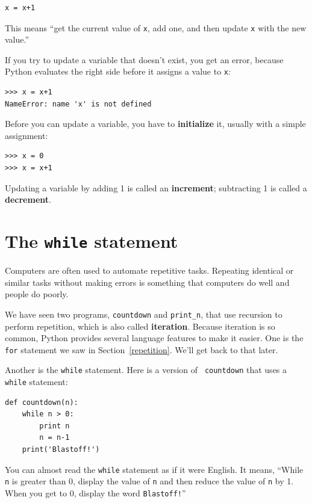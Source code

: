 \documentclass[10pt]{book}
\begin{document}
\beforeverb
\begin{verbatim}
x = x+1
\end{verbatim}
\afterverb
%
This means ``get the current value of {\tt x}, add one, and then
update {\tt x} with the new value.''

If you try to update a variable that doesn't exist, you get an
error, because Python evaluates the right side before it assigns
a value to {\tt x}:

\beforeverb
\begin{verbatim}
>>> x = x+1
NameError: name 'x' is not defined
\end{verbatim}
\afterverb
%
Before you can update a variable, you have to {\bf initialize}
it, usually with a simple assignment:


\beforeverb
\begin{verbatim}
>>> x = 0
>>> x = x+1
\end{verbatim}
\afterverb
%
Updating a variable by adding 1 is called an {\bf increment};
subtracting 1 is called a {\bf decrement}.





\section{The {\tt while} statement}


Computers are often used to automate repetitive tasks.  Repeating
identical or similar tasks without making errors is something that
computers do well and people do poorly.

We have seen two programs, {\tt countdown} and \verb"print_n", that
use recursion to perform repetition, which is also called {\bf
iteration}.  Because iteration is so common, Python provides several
language features to make it easier.  One is the {\tt for} statement
we saw in Section~\ref{repetition}.  We'll get back to that later.

Another is the {\tt while} statement.  Here is a version of {\tt
countdown} that uses a {\tt while} statement:

\beforeverb
\begin{verbatim}
def countdown(n):
    while n > 0:
        print n
        n = n-1
    print('Blastoff!')
\end{verbatim}
\afterverb
%
You can almost read the {\tt while} statement as if it were English.
It means, ``While {\tt n} is greater than 0,
display the value of {\tt n} and then reduce the value of
{\tt n} by 1.  When you get to 0, display the word {\tt Blastoff!}''
\end{document}
